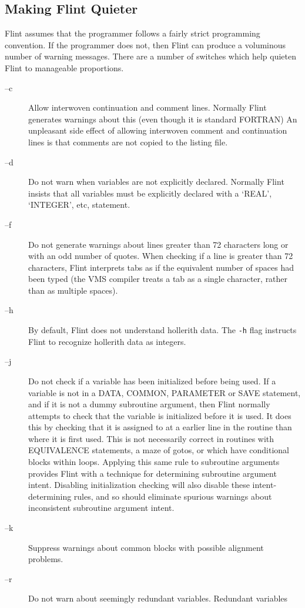 \subsection{Making Flint Quieter}
Flint assumes that the programmer follows a fairly strict programming
convention. If the programmer does not, then Flint can produce a voluminous
number of warning messages. There are a number of switches which help
quieten Flint to manageable proportions.
\begin{description}
\item[--c] Allow interwoven continuation and comment lines. Normally Flint
generates warnings about this (even though it is standard FORTRAN)
An unpleasant side effect of allowing interwoven
comment and continuation lines is that comments are not copied to the
listing file.
\item[--d] Do not warn when variables are not explicitly declared. Normally
Flint insists that all variables must be explicitly declared with a `REAL',
`INTEGER', etc, statement.
\item[--f] Do not generate warnings about lines greater than 72 characters long
or with an odd number of quotes. When checking if a line is
greater than 72 characters, Flint interprets tabs as if the equivalent
number of spaces had been typed (the VMS compiler treats a tab as a single
character, rather than as multiple spaces).
\item[--h] By default, Flint does not understand hollerith data. The {\tt -h}
flag instructs Flint to recognize hollerith data as integers.
\item[--j] Do not check if a variable has been initialized before being used.
If a variable is not in a DATA, COMMON, PARAMETER or SAVE statement,
and if it is not a dummy subroutine argument, then Flint normally
attempts to check that the variable is initialized before it is used. It does
this by checking that it is assigned to at a earlier line in the routine than
where it is first used. This is not necessarily correct in routines with
EQUIVALENCE statements, a maze of gotos, or which
have conditional blocks within loops. Applying this same rule to subroutine
arguments provides Flint with a technique for determining subroutine argument
intent. Disabling initialization checking will also disable these
intent-determining rules, and so should eliminate
spurious warnings about inconsistent subroutine argument intent.
\item[--k] Suppress warnings about common blocks with possible alignment
problems.
\item[--r] Do not warn about seemingly redundant variables. Redundant variables

\end{description}
